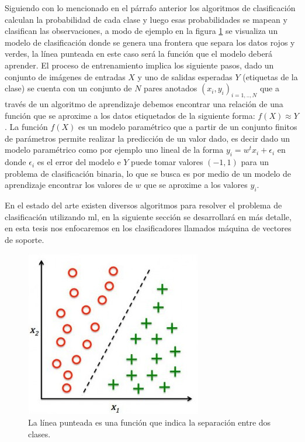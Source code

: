 Siguiendo con lo mencionado en el párrafo anterior los algoritmos de clasificación calculan la probabilidad de cada clase y luego esas probabilidades se mapean y  clasifican las observaciones, a modo de ejemplo en la figura \ref{Fig:clasificacion} se visualiza un modelo de clasificación donde se  genera una frontera que separa los datos rojos y verdes, la línea punteada en este caso será la función que el modelo deberá aprender. El proceso de entrenamiento implica los siguiente pasos, dado un conjunto de imágenes de entradas $X$ y uno de salidas esperadas $Y$ (etiquetas de la clase) se cuenta con un conjunto de $N$ pares anotados ${(x_i, y_i)}_{i=1,..,N}$  que a través de un algoritmo de aprendizaje debemos encontrar una relación de una función que se aproxime a los datos etiquetados de la siguiente forma: $f(X) ≈ Y$. La función $f(X)$ es un modelo paramétrico que a partir de un conjunto finitos de parámetros permite realizar la predicción de un valor dado, es decir dado un modelo paramétrico como por ejemplo uno lineal de la forma $y_i = w^t x_i + \epsilon_i$ en donde $\epsilon_i$ es el error del modelo e $Y$ puede tomar valores $(-1,1)$ para un problema de clasificación binaria, lo que se busca es por medio de un modelo de aprendizaje encontrar los valores de  $w$ que se aproxime a los valores $y_i$.

En el estado del arte existen diversos algoritmos para resolver el problema de clasificación utilizando \ac{ml}, en la siguiente sección se desarrollará en más detalle, en esta tesis nos enfocaremos en los clasificadores llamados máquina de vectores de soporte. 

\begin{figure}[H] \centering
  \includegraphics[scale=0.4,keepaspectratio=true,clip=true]{imagenes/MarcoTeorico/classification.jpg}
  \caption{La línea punteada es una función que indica la separación entre dos clases.}\label{Fig:clasificacion}
\end{figure}




